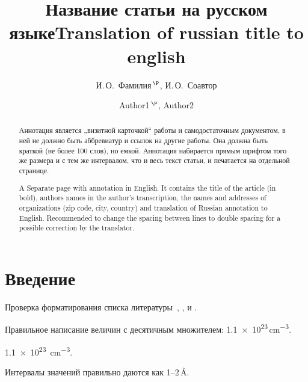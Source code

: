 \documentclass[14pt]{extarticle}
\begin{document}
\title{Название статьи на русском языке}
\author{И.\,О.~Фамилия$^{\,\P}$, И.\,О.~Соавтор}
\address{Физико-технический институт им. А. Ф. Иоффе Российской академии наук, 
\\ 194021, Санкт-Петербург, Россия.}
\maketitle

\begin{abstract}
	Аннотация является „визитной карточкой“ работы и самодостаточным документом,
	в ней не должно быть аббревиатур и ссылок на другие работы. Она должна быть краткой
	(не более 100 слов), но емкой. Аннотация набирается прямым шрифтом того же размера
	и с тем же интервалом, что и весь текст статьи, и печатается на отдельной странице.
\end{abstract}


\begin{otherlanguage}{english}
	\title{Translation of russian title to english}
	\author{Author1$^{\,\P}$, Author2}
	\address{Ioffe Physicotechnical Institute, Russian Academy of Sciences, \\
		194021, St. Petersburg, Russia.}
	\maketitle
	
	\begin{abstract}
		A Separate page with annotation in English. It contains the title of the article (in bold), authors names in the author's transcription, the names and addresses of organizations (zip code, city, country) and translation of Russian annotation to English.  Recommended to change the spacing between lines to double spacing for a possible correction by the translator.
	\end{abstract}
\end{otherlanguage}

\section{Введение}
Проверка форматирования списка литературы~\cite{ref1,ref2,ref3},
\cite{ref4},
\cite{ref5,ref5eng,ref6} и 
\cite{ref7,ref8,ref9}.

Правильное написание величин с десятичным множителем: 
\num{1,1e23}\,\si{\cm^{-3}}. \par
\SI{1,1e23}{\cm^{-3}}. \par
Интервалы значений правильно даются как \numrange{1}{2}\,\si{\angstrom}. 
\par
\end{document}

